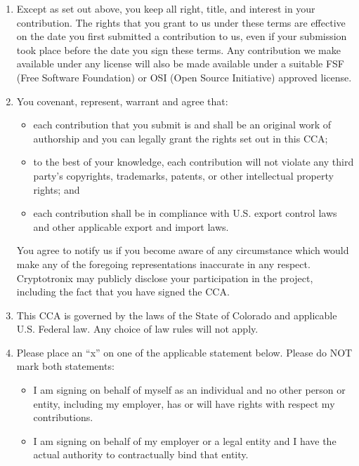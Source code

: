 \documentclass{article}
\begin{document}
\begin{enumerate}
\item Except as set out above, you keep all right, title, and interest
  in your contribution. The rights that you grant to us under these
  terms are effective on the date you first submitted a contribution
  to us, even if your submission took place before the date you sign
  these terms. Any contribution we make available under any license
  will also be made available under a suitable FSF (Free Software
  Foundation) or OSI (Open Source Initiative) approved license.

\item You covenant, represent, warrant and agree that:
\begin{itemize}
\item each contribution that you submit is and shall be an original
  work of authorship and you can legally grant the rights set out in
  this CCA;
\item to the best of your knowledge, each contribution will not
  violate any third party's copyrights, trademarks, patents, or other
  intellectual property rights; and
\item each contribution shall be in compliance with U.S. export
  control laws and other applicable export and import laws.
\end{itemize}

You agree to notify us if you become aware of any circumstance which
would make any of the foregoing representations inaccurate in any
respect. Cryptotronix may publicly disclose your participation in the
project, including the fact that you have signed the CCA.

\item This CCA is governed by the laws of the State of Colorado and
  applicable U.S. Federal law. Any choice of law rules will not apply.

\item Please place an “x” on one of the applicable statement below.
  Please do NOT mark both statements:

\begin{itemize}
  \item[] \underline{\hspace{1cm}} I am signing on behalf of myself
  as an individual and no other person or entity, including my
  employer, has or will have rights with respect my contributions.
\item[] \underline{\hspace{1cm}} I am signing on behalf of my employer
  or a legal entity and I have the actual authority to contractually
  bind that entity.
\end{itemize}
\end{enumerate}
\end{document}
